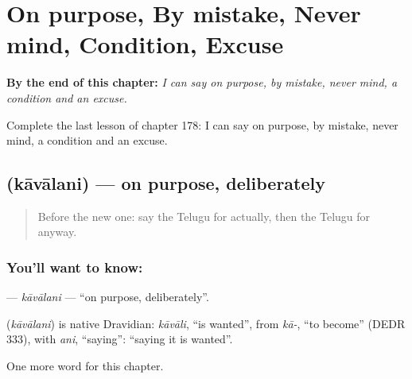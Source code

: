 
\chapter{On purpose, By mistake, Never mind, Condition, Excuse}
\label{ch:te-on-purpose-by-mistake-never-mind-condition-excuse}

\begin{chapteropening}
\textbf{By the end of this chapter:} \emph{I can say on purpose, by mistake, never mind, a condition and an excuse.}

Complete the last lesson of chapter 178: I can say on purpose, by mistake, never mind, a condition and an excuse.
\end{chapteropening}

\section[\texorpdfstring{\te{కావాలని} (kāvālani)}{కావాలని (kāvālani)}]{ (kāvālani) — on purpose, deliberately}

\label{lesson:TE-C178-kavalani}



\begin{quote}
Before the new one: say the Telugu for actually, then the Telugu for anyway.
\end{quote}

\subsection*{You'll want to know: }
\textbf{} — \emph{kāvālani} — \textquotedblleft{}on purpose, deliberately\textquotedblright{}.

\begin{cousinweb}
\textbf{} (\emph{kāvālani}) is native Dravidian: \emph{kāvāli}, \textquotedblleft{}is wanted\textquotedblright{}, from \emph{kā-}, \textquotedblleft{}to become\textquotedblright{} (DEDR 333), with \emph{ani}, \textquotedblleft{}saying\textquotedblright{}: \textquotedblleft{}saying it is wanted\textquotedblright{}.
\end{cousinweb}

\begin{grammarlens}[title={What you've built}]
One more word for this chapter.
\end{grammarlens}

